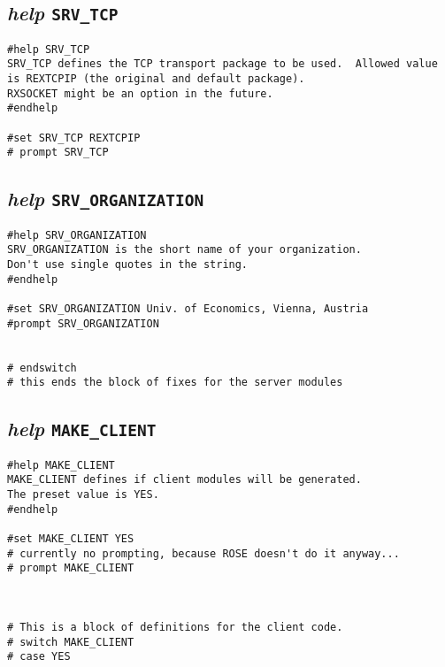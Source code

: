 \subsection{{\sl{help}} {\tt SRV\_TCP}}

\def\LPtopD{{\sl{help}} {\tt SRV\_TCP}}

\def\LPtopF{~}

\begin{verbatim}
#help SRV_TCP
SRV_TCP defines the TCP transport package to be used.  Allowed value
is REXTCPIP (the original and default package).
RXSOCKET might be an option in the future.
#endhelp

#set SRV_TCP REXTCPIP
# prompt SRV_TCP
\end{verbatim}

\subsection{{\sl{help}} {\tt SRV\_ORGANIZATION}}

\def\LPtopD{{\sl{help}} {\tt SRV\_ORGANIZATION}}

\def\LPtopF{~}

\begin{verbatim}
#help SRV_ORGANIZATION
SRV_ORGANIZATION is the short name of your organization.
Don't use single quotes in the string.
#endhelp

#set SRV_ORGANIZATION Univ. of Economics, Vienna, Austria
#prompt SRV_ORGANIZATION


# endswitch
# this ends the block of fixes for the server modules
\end{verbatim}

\subsection{{\sl{help}} {\tt MAKE\_CLIENT}}

\def\LPtopD{{\sl{help}} {\tt MAKE\_CLIENT}}

\def\LPtopF{~}

\begin{verbatim}
#help MAKE_CLIENT
MAKE_CLIENT defines if client modules will be generated.
The preset value is YES.
#endhelp

#set MAKE_CLIENT YES
# currently no prompting, because ROSE doesn't do it anyway...
# prompt MAKE_CLIENT



# This is a block of definitions for the client code.
# switch MAKE_CLIENT
# case YES
\end{verbatim}

